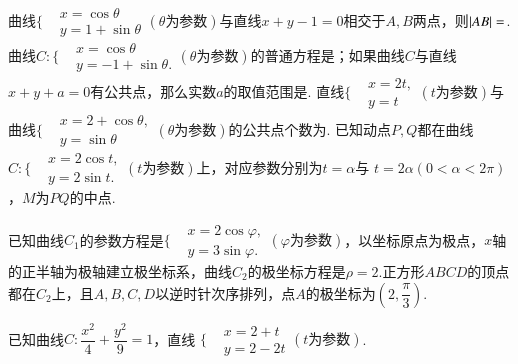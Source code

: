 \documentclass{BHCexam}
\begin{document}
\begin{questions}
\qs 曲线$\Bigg\{\begin{aligned}
&x=\cos\theta\\
&y=1+\sin\theta 
\end{aligned}(\theta \text{为参数})$与直线$ x+y-1=0 $相交于$ A,B $两点，则$ \left| AB \right|= $\tk.
\qs 曲线$ C:\Bigg\{\begin{aligned}
&x=\cos\theta\\
&y=-1+\sin\theta.
\end{aligned}(\theta\text{为参数}) $的普通方程是\tk；如果曲线$ C $与直线$ x+y+a=0 $有公共点，那么实数$ a $的取值范围是\tk.
\qs 直线$\Bigg\{\begin{aligned}
&x=2t,\\
&y=t
\end{aligned}\left(t\text{为参数}\right)$与曲线$\Bigg\{\begin{aligned}
&x=2+\cos\theta,\\
&y=\sin\theta
\end{aligned}\left(\theta\text{为参数}\right)$的公共点个数为\tk.
\qs 已知动点$ P,Q $都在曲线$ C:\Bigg\{\begin{aligned}
&x=2\cos t,\\
&y=2\sin t.
\end{aligned} (t\text{为参数})$上，对应参数分别为$ t=\alpha $与 $ t=2\alpha(0<\alpha<2\pi) $，$ M $为$ PQ $的中点.
\kongbai
\qs 已知曲线$C_1$的参数方程是$\Bigg\{\begin{aligned}
&x=2\cos\varphi,\\
&y=3\sin\varphi.
\end{aligned}(\varphi\text{为参数})$，以坐标原点为极点，$x$轴的正半轴为极轴建立极坐标系，曲线$C_2$的极坐标方程是$\rho=2$.正方形$ABCD$的顶点都在$C_2$上，且$A,B,C,D$以逆时针次序排列，点$A$的极坐标为$(2,\dfrac{\pi}{3})$.
\kongbai 
\qs 已知曲线$ C:\dfrac{x^2}{4}+\dfrac{y^2}{9}=1 $，直线 $\Bigg\{\begin{aligned}
&x=2+t\\
&y=2-2t
\end{aligned}(t\text{为参数}) $.
\begin{parts}

\end{parts}
\end{questions}
\end{document}
